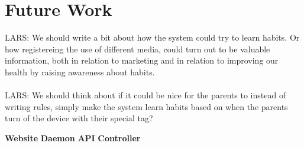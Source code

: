 \chapter{Future Work}
LARS: We should write a bit about how the system could try to learn habits. Or how registereing the use of different media, could turn out to be valuable information, both in relation to marketing and in relation to improving our health by raising awareness about habits.\\
\\
LARS: We should think about if it could be nice for the parents to instead of writing rules, simply make the system learn habits based on when the parents turn of the device with their special tag?

\textbf{Website}
\textbf{Daemon}
\textbf{API}
\textbf{Controller}


